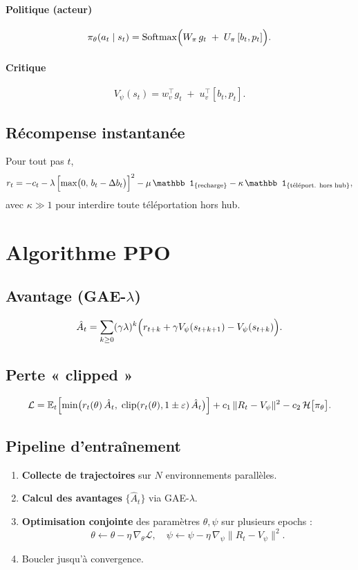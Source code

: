 \documentclass[11pt,a4paper]{article}
\newcommand{\E}{\mathbb{E}}
\begin{document}
\paragraph{Politique (acteur)}  
\[
  \pi_\theta(a_t\mid s_t)
  = \mathrm{Softmax}\Bigl(W_\pi\,g_t\;+\;U_\pi\,[b_t,p_t]\Bigr).
\]
\paragraph{Critique}  
\[
  V_\psi(s_t)
  = w_v^\top g_t \;+\; u_v^\top [b_t,p_t].
\]

\subsection{Récompense instantanée}
Pour tout pas \(t\),
\[
  r_t
  = -c_t
  - \lambda\,\Bigl[\max\bigl(0,\,b_t - \Delta b_t\bigr)\Bigr]^2
  - \mu\,\mathbb1_{\{\text{recharge}\}}
  - \kappa\,\mathbb1_{\{\text{téléport. hors hub}\}},
\]
avec \(\kappa\gg1\) pour interdire toute téléportation hors hub.

\section{Algorithme PPO}
\subsection{Avantage (GAE-\(\lambda\))}
\[
  \hat A_t 
  = \sum_{k\ge0}(\gamma\lambda)^k
    \Bigl(r_{t+k} 
    + \gamma V_\psi(s_{t+k+1})
    - V_\psi(s_{t+k})\Bigr).
\]
\subsection{Perte « clipped »}
\[
  \mathcal L
  = \E_t\Bigl[
      \min\bigl(r_t(\theta)\,\hat A_t,\;
                 \mathrm{clip}(r_t(\theta),1\pm\varepsilon)\,\hat A_t
           \bigr)
    \Bigr]
  + c_1\,\|R_t - V_\psi\|^2
  - c_2\,\mathcal H\bigl[\pi_\theta\bigr].
\]

\subsection{Pipeline d’entraînement}
\begin{enumerate}
  \item \textbf{Collecte de trajectoires} sur \(N\) environnements parallèles.
  \item \textbf{Calcul des avantages} \(\{\hat A_t\}\) via GAE-\(\lambda\).
  \item \textbf{Optimisation conjointe} des paramètres \(\theta,\psi\) sur plusieurs epochs :
    \[
      \theta\leftarrow\theta-\eta\,\nabla_\theta\mathcal{L},\quad
      \psi\leftarrow\psi-\eta\,\nabla_\psi\bigl\|R_t - V_\psi\bigr\|^2.
    \]
  \item Boucler jusqu’à convergence.
\end{enumerate}
\end{document}
